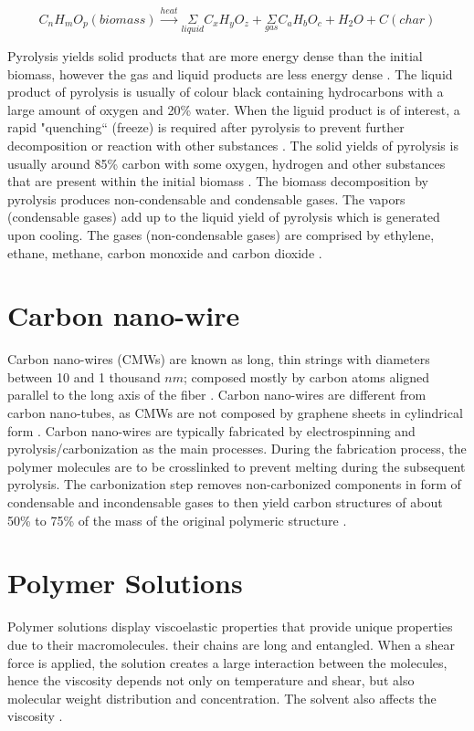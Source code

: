 \begin{equation}
C_{n} H_{m} O_{p} (biomass) \overset{heat}{\rightarrow} \underset{liquid}{\Sigma} C_{x} H_{y} O_{z} + \underset{gas}{\Sigma} C_{a} H_{b} O_{c} + H_{2} O + C (char)
\label{eq:genPyrolysis}
\end{equation}

Pyrolysis yields solid products that are more energy dense than the initial biomass, however the gas and liquid products are less energy dense \cite{Basu2018}. The liquid product of pyrolysis is usually of colour black containing hydrocarbons with a large amount of oxygen and 20\% water. When the liguid product is of interest, a rapid "quenching`` (freeze) is required after pyrolysis to prevent further decomposition or reaction with other substances \cite{Basu2018}. The solid yields of pyrolysis is usually around 85\% carbon with some oxygen, hydrogen and other substances that are present within the initial biomass \cite{Basu2018}. The biomass decomposition by pyrolysis produces non-condensable and condensable gases. The vapors (condensable gases) add up to the liquid yield of pyrolysis which is generated upon cooling. The gases (non-condensable gases) are comprised by ethylene, ethane, methane, carbon monoxide and carbon dioxide \cite{Basu2018}.

\section{Carbon nano-wire}
Carbon nano-wires (CMWs) are known as long, thin strings with diameters between 10 and 1 thousand $n m$; composed mostly by carbon atoms aligned parallel to the long axis of the fiber \cite{Nataraj2012}. Carbon nano-wires are different from carbon nano-tubes, as CMWs are not composed by graphene sheets in cylindrical form \cite{Nataraj2012}. Carbon nano-wires are typically fabricated by electrospinning and pyrolysis/carbonization as the main processes. During the fabrication process, the polymer molecules are to be crosslinked to prevent melting during the subsequent pyrolysis. The carbonization step removes non-carbonized components in form of condensable and incondensable gases \cite{Basu2018} to then yield carbon structures of about 50\% to 75\% of the mass of the original polymeric structure \cite{Nataraj2012}.

\section{Polymer Solutions}
Polymer solutions display viscoelastic properties that provide unique properties due to their macromolecules. their chains are long and entangled. When a shear force is applied, the solution creates a large interaction between the molecules, hence the viscosity depends not only on temperature and shear, but also molecular weight distribution and concentration. The solvent also affects the viscosity \cite{Flores2017, Huang2003, Baumgarten1971}.

